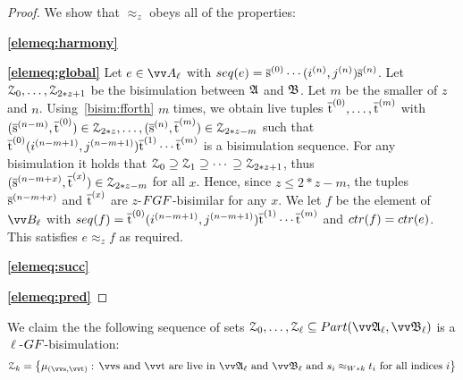 \begin{proof}
We show that $\approx_{z}$ obeys all of the properties:

\noindent
\textbf{\ref{elemeq:harmony}}

\noindent
\textbf{\ref{elemeq:global}}
Let $e \in \unraveldom{A}_{\ell}$ with $\seq{e} = \elemtuples^{(0)}\cdots{}(i^{(n)}, j^{(n)})\elemtuples^{(n)}$.
Let $\mathcal{Z}_{0}, \ldots, \mathcal{Z}_{2*z + 1}$ be the bisimulation between ${\mathfrak{A}}$ and ${\mathfrak{B}}$.
Let $m$ be the smaller of $z$ and $n$.
Using~\ref{bisim:fforth} $m$ times, we obtain live tuples $\overline{\mathrm{t}}^{(0)}, \ldots, \overline{\mathrm{t}}^{(m)}$ with $(\overline{\mathrm{s}}^{(n-m)}, \overline{\mathrm{t}}^{(0)}) \in \mathcal{Z}_{2*z}, \ldots, (\overline{\mathrm{s}}^{(n)}, \overline{\mathrm{t}}^{(m)}) \in \mathcal{Z}_{2*z - m}$ such that $\overline{\mathrm{t}}^{(0)}(i^{(n-m+1)}, j^{(n-m+1)})\overline{\mathrm{t}}^{(1)}\cdots{}\overline{\mathrm{t}}^{(m)}$ is a bisimulation sequence.
For any bisimulation it holds that $\mathcal{Z}_{0} \supseteq \mathcal{Z}_{1} \supseteq \cdots{} \supseteq \mathcal{Z}_{2*z+1}$, thus
$(\overline{\mathrm{s}}^{(n-m+x)}, \overline{\mathrm{t}}^{(x)}) \in \mathcal{Z}_{2*z - m}$ for all $x$.
Hence, since $z \le 2*z - m$, the tuples $\overline{\mathrm{s}}^{(n-m+x)}$ and $\overline{\mathrm{t}}^{(x)}$ are $z$-$\FGF$-bisimilar for any $x$.
We let $f$ be the element of $\unraveldom{B}_{\ell}$ with $\seq{f} = \elemtuplet^{(0)}(i^{(n-m+1)}, j^{(n-m+1)})\elemtuplet^{(1)}\cdots{}\elemtuplet^{(m)}$ and $\ctr{f} = \ctr{e}$.
This satisfies $e \approx_{z} f$ as required.

\noindent
\textbf{\ref{elemeq:succ}}

\noindent
\textbf{\ref{elemeq:pred}}
\end{proof}

We claim the the following sequence of sets $\bisimZ_{0}, \ldots, \bisimZ_{\ell} \subseteq \PartIso{\unravel{A}_{\ell}}{\unravel{B}_{\ell}}$ is a $\ell$-$\GF$-bisimulation:
\begin{equation*}
  \bisimZ_{k} = \left\{
    \mu_{(\elemtuptuples, \elemtuptuplet)}:\,
    \elemtuptuples\ \text{and}\ \elemtuptuplet\ \text{are live in}\ \unravel{A}_{\ell}\ \text{and}\ \unravel{B}_{\ell}\
    \text{and}\ s_{i} \approx_{W * k} t_{i}\ \text{for all indices $i$}
  \right\}
\end{equation*}


